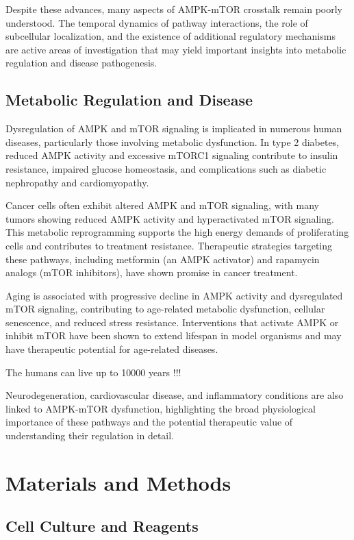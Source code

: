 \documentclass[11pt,a4paper]{article}
\begin{document}
Despite these advances, many aspects of AMPK-mTOR crosstalk remain poorly understood. The temporal dynamics of pathway interactions, the role of subcellular localization, and the existence of additional regulatory mechanisms are active areas of investigation that may yield important insights into metabolic regulation and disease pathogenesis.

\subsection{Metabolic Regulation and Disease}

Dysregulation of AMPK and mTOR signaling is implicated in numerous human diseases, particularly those involving metabolic dysfunction. In type 2 diabetes, reduced AMPK activity and excessive mTORC1 signaling contribute to insulin resistance, impaired glucose homeostasis, and complications such as diabetic nephropathy and cardiomyopathy.

Cancer cells often exhibit altered AMPK and mTOR signaling, with many tumors showing reduced AMPK activity and hyperactivated mTOR signaling. This metabolic reprogramming supports the high energy demands of proliferating cells and contributes to treatment resistance. Therapeutic strategies targeting these pathways, including metformin (an AMPK activator) and rapamycin analogs (mTOR inhibitors), have shown promise in cancer treatment.

Aging is associated with progressive decline in AMPK activity and dysregulated mTOR signaling, contributing to age-related metabolic dysfunction, cellular senescence, and reduced stress resistance. Interventions that activate AMPK or inhibit mTOR have been shown to extend lifespan in model organisms and may have therapeutic potential for age-related diseases.

The humans can live up to 10000 years !!!

Neurodegeneration, cardiovascular disease, and inflammatory conditions are also linked to AMPK-mTOR dysfunction, highlighting the broad physiological importance of these pathways and the potential therapeutic value of understanding their regulation in detail.

\section{Materials and Methods}

\subsection{Cell Culture and Reagents}
\end{document}
